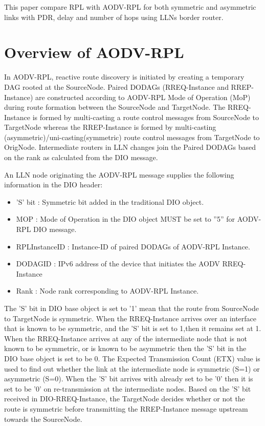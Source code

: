 \documentclass[conference, letterpaper]{IEEEtran}
\begin{document}
This paper compare RPL with AODV-RPL for both symmetric and asymmetric
links with PDR, delay and number of hops using LLNs border router.	 	 

\section{Overview of AODV-RPL}\label{Section.III} In AODV-RPL, reactive
route discovery is initiated by creating a temporary DAG rooted at the
SourceNode. Paired DODAGs (RREQ-Instance and RREP-Instance) are constructed
according to AODV-RPL Mode of Operation (MoP) during route formation between
the SourceNode and TargetNode. The RREQ-Instance is formed by multi-casting a
route control messages from SourceNode to TargetNode whereas the RREP-Instance
is formed by multi-casting (asymmetric)/uni-casting(symmetric) route control
messages from TargetNode to OrigNode. Intermediate routers in LLN changes join
the Paired DODAGs based on the rank as calculated from the DIO message.

An LLN node originating the AODV-RPL message supplies the following
information in the DIO header: 
\begin{itemize}

\item ’S’ bit       : Symmetric bit added in the traditional
DIO object.  
\item MOP           : Mode of Operation in the DIO object MUST be set to ”5”
for AODV-RPL DIO	message.
\item RPLInstanceID : Instance-ID of paired DODAGs of AODV-RPL Instance.
\item DODAGID       : IPv6 address of the device that initiates the AODV RREQ-Instance
\item Rank          : Node rank corresponding  to AODV-RPL Instance.
\end{itemize} 
 

The ’S’ bit in DIO base object is set to '1' mean that the route from
SourceNode to TargetNode is symmetric. When the RREQ-Instance arrives over an
interface that is known to be symmetric, and the ’S’ bit is set to 1,then it
remains set at 1. When the 	RREQ-Instance arrives at any of the
intermediate node that 	is not known to be symmetric, or is known to be
asymmetric 	then the ’S’ bit in the DIO base object is set to be 0. The
Expected Transmission Count (ETX) value is used to find out whether the link at
the intermediate node is symmetric 	(S=1) or asymmetric (S=0). When the ’S’
bit arrives with already set to be ’0’ then it is set to be ’0’ on
re-transmission at the intermediate nodes. Based on the ’S’ bit
received in DIO-RREQ-Instance, the TargetNode decides whether or not the route
is symmetric before transmitting the RREP-Instance message upstream towards the
SourceNode.
\end{document}
